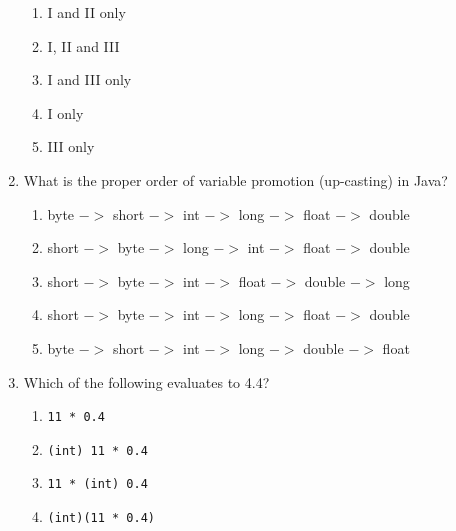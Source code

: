 \documentclass[CS180-S16-FinalExam.tex]{subfiles}
\begin{document}
\begin{enumerate}
\begin{enumerate}
\item I and II only  \ifdraft \Ans \fi
\item I, II and III
\item I and III only
\item I only
\item III only
\end{enumerate}


\item  What is the proper order of variable promotion (up-casting) in Java?

\begin{enumerate}
\item byte $->$ short $->$ int $->$ long $->$ float $->$ double \ifdraft \Ans \fi
\item short $->$ byte $->$ long $->$ int $->$ float $->$ double
\item short $->$ byte $->$ int $->$ float $->$ double $->$ long
\item short $->$ byte $->$ int $->$ long $->$ float $->$ double
\item byte $->$ short $->$ int $->$ long $->$ double $->$ float
\end{enumerate}



\clearpage
\item 
Which of the following evaluates to 4.4?

\begin{enumerate}[I]
\item \texttt{11 * 0.4}
\item \texttt{(int) 11 * 0.4}
\item \texttt{11 * (int) 0.4}
\item \texttt{(int)(11 * 0.4)}
 

\end{enumerate}
\end{enumerate}
\end{document}

